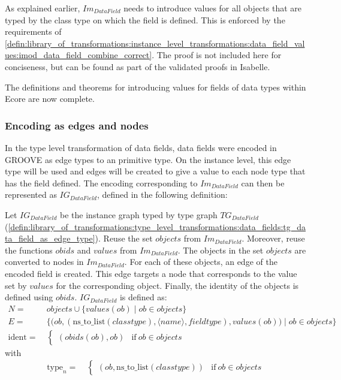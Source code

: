 As explained earlier, $Im_{DataField}$ needs to introduce values for all objects that are typed by the class type on which the field is defined. This is enforced by the requirements of \cref{defin:library_of_transformations:instance_level_transformations:data_field_values:imod_data_field_combine_correct}. The proof is not included here for conciseness, but can be found as part of the validated proofs in Isabelle.

The definitions and theorems for introducing values for fields of data types within Ecore are now complete. 

\subsubsection{Encoding as edges and nodes}

In the type level transformation of data fields, data fields were encoded in GROOVE as edge types to an primitive type. On the instance level, this edge type will be used and edges will be created to give a value to each node type that has the field defined. The encoding corresponding to $Im_{DataField}$ can then be represented as $IG_{DataField}$, defined in the following definition:

\begin{defin}
\label{defin:library_of_transformations:instance_level_transformations:data_field_values:ig_data_field_as_edge_type}
Let $IG_{DataField}$ be the instance graph typed by type graph $TG_{DataField}$ (\cref{defin:library_of_transformations:type_level_transformations:data_fields:tg_data_field_as_edge_type}). Reuse the set $objects$ from $Im_{DataField}$. Moreover, reuse the functions $obids$ and $values$ from $Im_{DataField}$.
The objects in the set $objects$ are converted to nodes in $Im_{DataField}$. For each of these objects, an edge of the encoded field is created. This edge targets a node that corresponds to the value set by $values$ for the corresponding object. Finally, the identity of the objects is defined using $obids$. $IG_{DataField}$ is defined as:
\begin{align*}
N =\ & objects \cup \{values(ob) \mid ob \in objects\} \\
E =\ & \big\{\big(ob, (\mathrm{ns\_\!to\_\!list}(classtype), \langle name \rangle, fieldtype), values(ob)\big) \mid ob \in objects \big\} \\
\mathrm{ident} =\ & \begin{cases}
    (obids(ob), ob) & \mathrm{if }\ ob \in objects
\end{cases}
\end{align*}
with
\begin{align*}
\mathrm{type}_n =\ & \begin{cases}
    (ob, \mathrm{ns\_\!to\_\!list}(classtype)) & \mathrm{if }\ ob \in objects
\end{cases}
\end{align*}
\end{defin}

